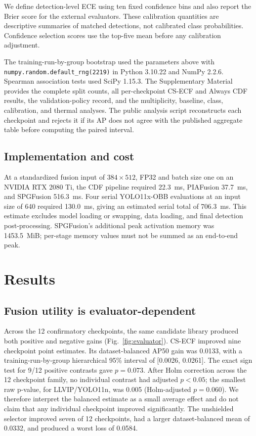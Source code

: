 \documentclass[preprint,11pt]{elsarticle}
\begin{document}
We define detection-level ECE using ten fixed confidence bins and also report
the Brier score for the external evaluators. These calibration quantities are
descriptive summaries of matched detections, not calibrated class
probabilities. Confidence selection scores use the top-five mean before any
calibration adjustment.

The training-run-by-group bootstrap used the parameters above with
\texttt{numpy.random.default\_rng(2219)} in Python 3.10.22 and NumPy 2.2.6.
Spearman association tests used SciPy 1.15.3.
The Supplementary Material provides the complete split counts, all
per-checkpoint CS-ECF and Always CDF results, the validation-policy record, and
the multiplicity, baseline, class, calibration, and thermal analyses. The
public analysis script reconstructs each checkpoint
and rejects it if its AP does not agree with the published aggregate table
before computing the paired interval.

\subsection{Implementation and cost}

At a standardized fusion input of \(384\times512\), FP32 and batch size one on
an NVIDIA RTX 2080 Ti, the CDF pipeline required \SI{22.3}{ms}, PIAFusion
\SI{37.7}{ms}, and SPGFusion \SI{516.3}{ms}. Four serial YOLO11x-OBB evaluations
at an input size of 640 required \SI{130.0}{ms}, giving an estimated serial
total of \SI{706.3}{ms}. This estimate excludes model loading or swapping, data
loading, and final detection post-processing. SPGFusion's additional peak
activation memory was \SI{1453.5}{MiB}; per-stage memory values must not be
summed as an end-to-end peak.

\section{Results}

\subsection{Fusion utility is evaluator-dependent}

Across the 12 confirmatory checkpoints, the same candidate library produced
both positive and negative gains (Fig.~\ref{fig:evaluator}). CS-ECF improved
nine checkpoint point estimates. Its dataset-balanced AP50 gain was 0.0133,
with a training-run-by-group hierarchical 95\% interval of [0.0026, 0.0261].
The exact sign test for 9/12 positive contrasts gave \(p=0.073\). After Holm
correction across the 12 checkpoint family, no individual contrast had
adjusted \(p<0.05\); the smallest raw p-value, for LLVIP/YOLO11n, was 0.005
(Holm-adjusted \(p=0.060\)). We therefore interpret the balanced estimate as a
small average effect and do not claim that any individual checkpoint improved
significantly. The unshielded
selector improved seven of 12 checkpoints, had a larger dataset-balanced mean of
0.0332, and produced a worst loss of 0.0584.
\end{document}
